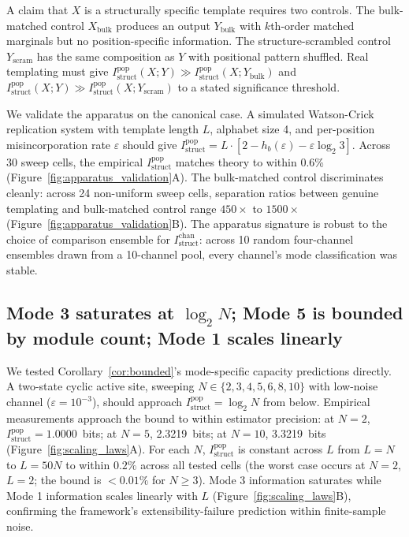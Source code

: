 \documentclass[aps,prx,reprint,amsmath,amssymb,floatfix,superscriptaddress,nofootinbib]{revtex4-2}
\theoremstyle{plain-thm}
\theoremstyle{definition-thm}
\newcommand{\Istructpop}{I_{\mathrm{struct}}^{\mathrm{pop}}}
\newcommand{\Istructchan}{I_{\mathrm{struct}}^{\mathrm{chan}}}
\newcommand{\Hbin}{h_b}
\begin{document}
A claim that $X$ is a structurally specific template requires two controls. The bulk-matched control $X_{\mathrm{bulk}}$ produces an output $Y_{\mathrm{bulk}}$ with $k$th-order matched marginals but no position-specific information. The structure-scrambled control $Y_{\mathrm{scram}}$ has the same composition as $Y$ with positional pattern shuffled. Real templating must give $\Istructpop(X; Y) \gg \Istructpop(X; Y_{\mathrm{bulk}})$ and $\Istructpop(X; Y) \gg \Istructpop(X; Y_{\mathrm{scram}})$ to a stated significance threshold.

We validate the apparatus on the canonical case. A simulated Watson-Crick replication system with template length $L$, alphabet size 4, and per-position misincorporation rate $\varepsilon$ should give $\Istructpop = L \cdot \left[2 - \Hbin(\varepsilon) - \varepsilon \log_2 3\right]$. Across 30 sweep cells, the empirical $\Istructpop$ matches theory to within 0.6\% (Figure~\ref{fig:apparatus_validation}A). The bulk-matched control discriminates cleanly: across 24 non-uniform sweep cells, separation ratios between genuine templating and bulk-matched control range $450 \times$ to $1500 \times$ (Figure~\ref{fig:apparatus_validation}B). The apparatus signature is robust to the choice of comparison ensemble for $\Istructchan$: across 10 random four-channel ensembles drawn from a 10-channel pool, every channel's mode classification was stable.

\subsection{Mode 3 saturates at $\log_2 N$; Mode 5 is bounded by module count; Mode 1 scales linearly}

We tested Corollary~\ref{cor:bounded}'s mode-specific capacity predictions directly. A two-state cyclic active site, sweeping $N \in \{2, 3, 4, 5, 6, 8, 10\}$ with low-noise channel ($\varepsilon = 10^{-3}$), should approach $\Istructpop = \log_2 N$ from below. Empirical measurements approach the bound to within estimator precision: at $N = 2$, $\Istructpop = 1.0000$~bits; at $N = 5$, 2.3219~bits; at $N = 10$, 3.3219~bits (Figure~\ref{fig:scaling_laws}A). For each $N$, $\Istructpop$ is constant across $L$ from $L = N$ to $L = 50N$ to within $0.2\%$ across all tested cells (the worst case occurs at $N = 2$, $L = 2$; the bound is $< 0.01\%$ for $N \ge 3$). Mode 3 information saturates while Mode 1 information scales linearly with $L$ (Figure~\ref{fig:scaling_laws}B), confirming the framework's extensibility-failure prediction within finite-sample noise.
\end{document}
